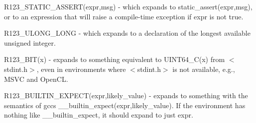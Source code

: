 \begin{DoxyItemize}
\item R123\+\_\+\+S\+T\+A\+T\+I\+C\+\_\+\+A\+S\+S\+E\+R\+T(expr,msg) -\/ which expands to static\+\_\+assert(expr,msg), or to an expression that will raise a compile-\/time exception if expr is not true.


\item R123\+\_\+\+U\+L\+O\+N\+G\+\_\+\+L\+O\+NG -\/ which expands to a declaration of the longest available unsigned integer.


\item R123\+\_\+B\+I\+T(x) -\/ expands to something equivalent to U\+I\+N\+T64\+\_\+\+C(x) from $<$stdint.\+h$>$, even in environments where $<$stdint.\+h$>$ is not available, e.\+g., M\+S\+VC and Open\+CL.


\item R123\+\_\+\+B\+U\+I\+L\+T\+I\+N\+\_\+\+E\+X\+P\+E\+C\+T(expr,likely\+\_\+value) -\/ expands to something with the semantics of gcc\textquotesingle{}s \+\_\+\+\_\+builtin\+\_\+expect(expr,likely\+\_\+value). If the environment has nothing like \+\_\+\+\_\+builtin\+\_\+expect, it should expand to just expr. 
\end{DoxyItemize}